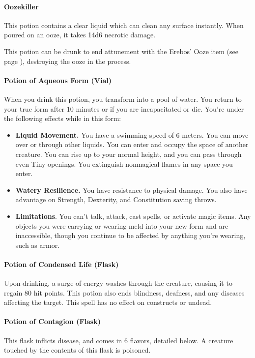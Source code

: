 \paragraph{Oozekiller} \label{item::oozekiller}
    This potion contains a clear liquid which can clean any surface instantly.
    When poured on an ooze, it takes 14d6 necrotic damage.

    This potion can be drunk to end attunement with the Erebos' Ooze item (see page \pageref{item::erebosooze}), destroying the ooze in the process.
\paragraph{Potion of Aqueous Form (Vial)}
    When you drink this potion, you transform into a pool of water.
    You return to your true form after 10 minutes or if you are incapacitated or die.
    You're under the following effects while in this form:
    \begin{itemize}
        \item \textbf{Liquid Movement.} You have a swimming speed of 6 meters.
        You can move over or through other liquids.
        You can enter and occupy the space of another creature.
        You can rise up to your normal height, and you can pass through even Tiny openings.
        You extinguish nonmagical flames in any space you enter.
        \item \textbf{Watery Resilience.} You have resistance to physical damage.
        You also have advantage on Strength, Dexterity, and Constitution saving throws.
        \item \textbf{Limitations}. You can't talk, attack, cast spells, or activate magic items.
        Any objects you were carrying or wearing meld into your new form and are inaccessible, though you continue to be affected by anything you're wearing, such as armor.
    \end{itemize}
\paragraph{Potion of Condensed Life (Flask)} %
    Upon drinking, a surge of energy washes through the creature, causing it to regain 80 hit points.
    This potion also ends blindness, deafness, and any diseases affecting the target.
    This spell has no effect on constructs or undead.
\paragraph{Potion of Contagion (Flask)} %
    This flask inflicts disease, and comes in 6 flavors, detailed below.
    A creature touched by the contents of this flask is poisoned.

